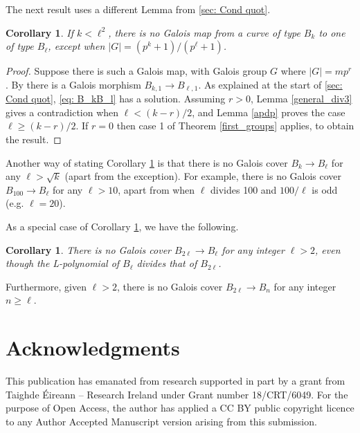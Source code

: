 \documentclass[oneside,a4paper,12pt]{article}
\theoremstyle{plain} %
\newtheorem{corollary}[theorem]{Corollary}
\theoremstyle{definition} %
\begin{document}
The next result uses a different Lemma from \cref{sec: Cond quot}.

\begin{corollary}\label{result2}
If $k<\ell^2$, there is no Galois map from a curve of type $B_k$ to one of type $B_{\ell}$, except when $|G|=(p^k+1)/(p^\ell +1)$.
\end{corollary}

\begin{proof} Suppose there is such a Galois map, with Galois group $G$ where
$|G|=mp^r$. 
By   there is a Galois morphism 
$B_{k,1}\longrightarrow B_{\ell,1}$.
As explained at the start of \cref{sec: Cond quot},
\eqref{eq: B_kB_l} has a solution.
Assuming $r>0$, 
Lemma \ref{general_div3}  gives a contradiction when $\ell <(k-r)/2$,
and  Lemma \ref{apdp} proves the case $\ell \ge (k-r)/2$.
If $r=0$ then case 1 of Theorem \ref{first_groups} applies, 
to obtain the result.
\end{proof}


Another way of stating Corollary \ref{result2} is that there is no Galois cover 
$B_{k}\longrightarrow B_\ell$ for any $\ell > \sqrt{k}$
(apart from the exception).
For example, there is no Galois cover 
$B_{100}\longrightarrow B_\ell$ for any $\ell > 10$,
apart from when $\ell$ divides 100 and $100/\ell$ is odd (e.g. $\ell=20$).


As a special case of Corollary \ref{result2}, we have the following.


 \begin{corollary}
 There is no Galois cover
$B_{2\ell}\longrightarrow B_\ell$ for any integer $\ell > 2$,
even though the L-polynomial of $B_\ell$ divides that of $B_{2\ell}$.
\end{corollary}

Furthermore, given $\ell>2$, there is no Galois cover
$B_{2\ell}\longrightarrow B_n$ for any integer $n\ge \ell $.


\section*{Acknowledgments}

This publication has emanated from research supported in part by a grant from Taighde Éireann – Research Ireland under Grant number 18/CRT/6049. For the purpose of Open Access, the author has applied a CC BY public copyright licence to any Author Accepted Manuscript version arising from this submission.


	
\end{document}
